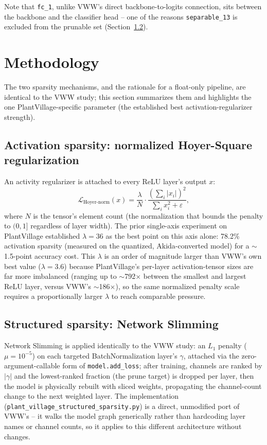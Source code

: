 \documentclass[11pt]{article}
\newcommand{\code}[1]{\texttt{#1}}
\begin{document}
Note that \code{fc\_1}, unlike VWW's direct backbone-to-logits connection, sits between the backbone and the classifier head -- one of the reasons \code{separable\_13} is excluded from the prunable set (Section~\ref{sec:structured}).

\section{Methodology}

The two sparsity mechanisms, and the rationale for a float-only pipeline, are identical to the VWW study; this section summarizes them and highlights the one PlantVillage-specific parameter (the established best activation-regularizer strength).

\subsection{Activation sparsity: normalized Hoyer-Square regularization}

An activity regularizer is attached to every ReLU layer's output $x$:
\begin{equation}
\mathcal{L}_{\text{Hoyer-norm}}(x) = \frac{\lambda}{N} \cdot \frac{\left(\sum_i |x_i|\right)^2}{\sum_i x_i^2 + \varepsilon},
\end{equation}
where $N$ is the tensor's element count (the normalization that bounds the penalty to $(0,1]$ regardless of layer width). The prior single-axis experiment on PlantVillage established $\lambda=36$ as the best point on this axis alone: 78.2\% activation sparsity (measured on the quantized, Akida-converted model) for a $\sim$1.5-point accuracy cost. This $\lambda$ is an order of magnitude larger than VWW's own best value ($\lambda=3.6$) because PlantVillage's per-layer activation-tensor sizes are far more imbalanced (ranging up to $\sim$792$\times$ between the smallest and largest ReLU layer, versus VWW's $\sim$186$\times$), so the same normalized penalty scale requires a proportionally larger $\lambda$ to reach comparable pressure.

\subsection{Structured sparsity: Network Slimming}
\label{sec:structured}

Network Slimming \cite{networkslimming} is applied identically to the VWW study: an $L_1$ penalty ($\mu=10^{-5}$) on each targeted BatchNormalization layer's $\gamma$, attached via the zero-argument-callable form of \code{model.add\_loss}; after training, channels are ranked by $|\gamma|$ and the lowest-ranked fraction (the prune target) is dropped per layer, then the model is physically rebuilt with sliced weights, propagating the channel-count change to the next weighted layer. The implementation (\code{plant\_\allowbreak village\_\allowbreak structured\_\allowbreak sparsity.\allowbreak py}) is a direct, unmodified port of VWW's -- it walks the model graph generically rather than hardcoding layer names or channel counts, so it applies to this different architecture without changes.
\end{document}
